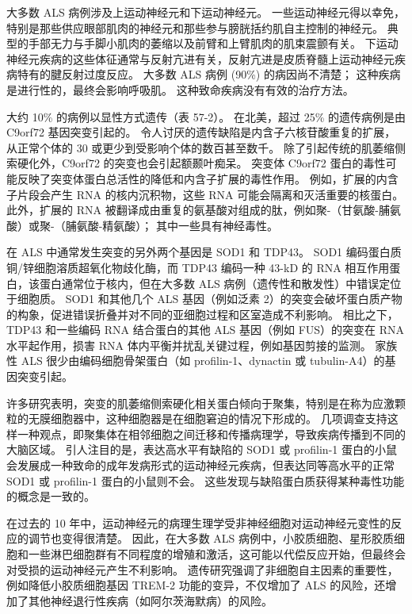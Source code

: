 大多数 ALS 病例涉及上运动神经元和下运动神经元。 一些运动神经元得以幸免，特别是那些供应眼部肌肉的神经元和那些参与膀胱括约肌自主控制的神经元。 典型的手部无力与手脚小肌肉的萎缩以及前臂和上臂肌肉的肌束震颤有关。 下运动神经元疾病的这些体征通常与反射亢进有关，反射亢进是皮质脊髓上运动神经元疾病特有的腱反射过度反应。 大多数 ALS 病例 (90\%) 的病因尚不清楚； 这种疾病是进行性的，最终会影响呼吸肌。 这种致命疾病没有有效的治疗方法。

大约 10\% 的病例以显性方式遗传（表 57-2）。 在北美，超过 25\% 的遗传病例是由 C9orf72 基因突变引起的。 令人讨厌的遗传缺陷是内含子六核苷酸重复的扩展，从正常个体的 30 或更少到受影响个体的数百甚至数千。 除了引起传统的肌萎缩侧索硬化外，C9orf72 的突变也会引起额颞叶痴呆。 突变体 C9orf72 蛋白的毒性可能反映了突变体蛋白总活性的降低和内含子扩展的毒性作用。 例如，扩展的内含子片段会产生 RNA 的核内沉积物，这些 RNA 可能会隔离和灭活重要的核蛋白。 此外，扩展的 RNA 被翻译成由重复的氨基酸对组成的肽，例如聚-（甘氨酸-脯氨酸）或聚-（脯氨酸-精氨酸）； 其中一些具有神经毒性。

在 ALS 中通常发生突变的另外两个基因是 SOD1 和 TDP43。 SOD1 编码蛋白质铜/锌细胞溶质超氧化物歧化酶，而 TDP43 编码一种 43-kD 的 RNA 相互作用蛋白，该蛋白通常位于核内，但在大多数 ALS 病例（遗传性和散发性）中错误定位于细胞质。 SOD1 和其他几个 ALS 基因（例如泛素 2）的突变会破坏蛋白质产物的构象，促进错误折叠并对不同的亚细胞过程和区室造成不利影响。 相比之下，TDP43 和一些编码 RNA 结合蛋白的其他 ALS 基因（例如 FUS）的突变在 RNA 水平起作用，损害 RNA 体内平衡并扰乱关键过程，例如基因剪接的监测。 家族性 ALS 很少由编码细胞骨架蛋白（如 profilin-1、dynactin 或 tubulin-A4）的基因突变引起。

许多研究表明，突变的肌萎缩侧索硬化相关蛋白倾向于聚集，特别是在称为应激颗粒的无膜细胞器中，这种细胞器是在细胞窘迫的情况下形成的。 几项调查支持这样一种观点，即聚集体在相邻细胞之间迁移和传播病理学，导致疾病传播到不同的大脑区域。 引人注目的是，表达高水平有缺陷的 SOD1 或 profilin-1 蛋白的小鼠会发展成一种致命的成年发病形式的运动神经元疾病，但表达同等高水平的正常 SOD1 或 profilin-1 蛋白的小鼠则不会。 这些发现与缺陷蛋白质获得某种毒性功能的概念是一致的。

在过去的 10 年中，运动神经元的病理生理学受非神经细胞对运动神经元变性的反应的调节也变得很清楚。 因此，在大多数 ALS 病例中，小胶质细胞、星形胶质细胞和一些淋巴细胞群有不同程度的增殖和激活，这可能以代偿反应开始，但最终会对受损的运动神经元产生不利影响。 遗传研究强调了非细胞自主因素的重要性，例如降低小胶质细胞基因 TREM-2 功能的变异，不仅增加了 ALS 的风险，还增加了其他神经退行性疾病（如阿尔茨海默病）的风险。

